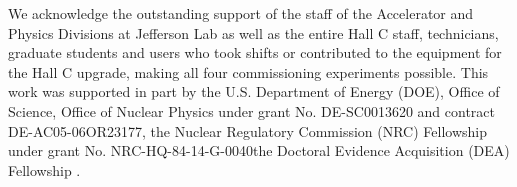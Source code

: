\indent We acknowledge the outstanding support of the staff of the Accelerator and Physics Divisions at Jefferson Lab
as well as the entire Hall C staff, technicians, graduate students and users who took shifts or contributed
to the equipment for the Hall C upgrade, making all four commissioning experiments possible. This work
was supported in part by the U.S. Department of Energy (DOE), Office of Science, Office of Nuclear Physics
under grant No. DE-SC0013620 and contract DE-AC05-06OR23177, the Nuclear Regulatory Commission (NRC) Fellowship
under grant No. NRC-HQ-84-14-G-0040\DIFdelbegin {}\DIFdelend \DIFaddbegin \DIFadd{, }\DIFaddend the Doctoral Evidence Acquisition (DEA) Fellowship \DIFaddbegin {}\DIFaddend .


